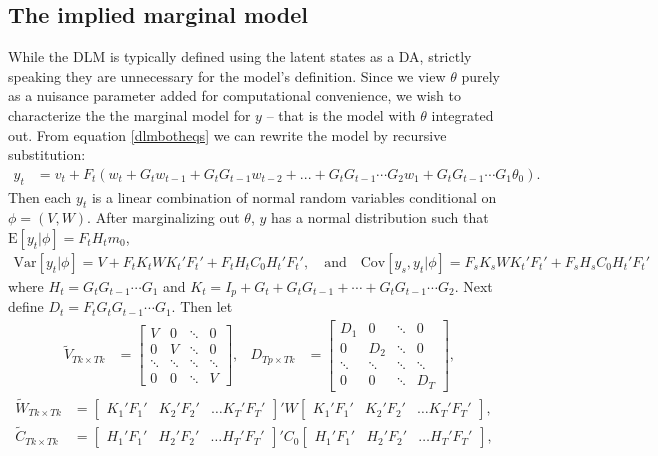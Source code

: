 \documentclass{article}
\begin{document}
\subsection{The implied marginal model}\label{sec:DLM:marg}

While the DLM is typically defined using the latent states as a DA, strictly speaking they are unnecessary for the model's definition. Since we view $\theta$ purely as a nuisance parameter added for computational convenience, we wish to characterize the the marginal model for $y$ -- that is the model with $\theta$ integrated out. From equation \eqref{dlmbotheqs} we can rewrite the model by recursive substitution:
\begin{align*}
  y_t &= v_t + F_t\left(w_t + G_tw_{t-1} + G_tG_{t-1}w_{t-2} + ... + G_tG_{t-1}\cdots G_{2}w_1 + G_tG_{t-1}\cdots G_1\theta_0\right).
\end{align*}
Then each $y_t$ is a linear combination of normal random variables conditional on $\phi=(V,W)$. After marginalizing out $\theta$, $y$ has a normal distribution such that $\mathrm{E}[y_t|\phi] =  F_tH_tm_0$,
\begin{align*}
  \mathrm{Var}[y_t|\phi] =  V + F_tK_tWK_t'F_t' + F_tH_tC_0H_t'F_t',\quad \mathrm{and} \quad
  \mathrm{Cov}[y_s,y_t|\phi] = F_sK_sWK_t'F_t' + F_sH_sC_0H_t'F_t'
\end{align*}
where $H_t = G_tG_{t-1}\cdots G_1$ and $K_t = I_p + G_t + G_tG_{t-1} + \cdots + G_tG_{t-1}\cdots G_2$. Next define $D_t = F_tG_tG_{t-1}\cdots G_1$. Then let
\begin{align*}
\tilde{V}_{Tk\times Tk} & = \begin{bmatrix} 
V & 0 & \ddots & 0\\
0 & V & \ddots & 0\\
\ddots & \ddots & \ddots & \ddots\\
0 & 0 & \ddots & V 
\end{bmatrix}, &
D_{Tp\times Tk} &= \begin{bmatrix} 
D_1 & 0 & \ddots & 0\\
0 & D_2 & \ddots & 0\\
\ddots & \ddots & \ddots & \ddots\\
0 & 0 & \ddots & D_T 
\end{bmatrix}, 
\end{align*}
\begin{align*}
\tilde{W}_{Tk\times Tk} &= \begin{bmatrix} K_1'F_1' & K_2'F_2' & \hdots K_T'F_T' \end{bmatrix}' W \begin{bmatrix} K_1'F_1' & K_2'F_2' & \hdots K_T'F_T' \end{bmatrix},&\\
\tilde{C}_{Tk\times Tk} &= \begin{bmatrix} H_1'F_1' & H_2'F_2' & \hdots H_T'F_T' \end{bmatrix}' C_0 \begin{bmatrix} H_1'F_1' & H_2'F_2' & \hdots H_T'F_T' \end{bmatrix},&
\end{align*} 
\end{document}
